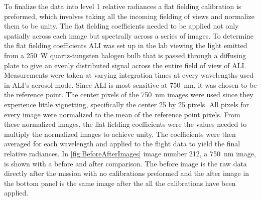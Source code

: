 \documentclass[12pt]{article}
\begin{document}
To finalize the data into level 1 relative radiances a flat fielding calibration is preformed, which involves taking all the incoming fielding of views and normalize them to be unity. The flat fielding coefficients needed to be applied not only spatially across each image but spectrally across a series of images. To determine the flat fielding coefficients ALI was set up in the lab viewing the light emitted from a 250~W quartz-tungsten halogen bulb that is passed through a diffusing plate to give an evenly distributed signal across the entire field of view of ALI. Measurements were taken at varying integration times at every wavelengths used in ALI's aerosol mode. Since ALI is most sensitive at 750~nm, it was chosen to be the reference point. The center pixels of the 750~nm images were used since they experience little vignetting, specifically the center 25 by 25 pixels. All pixels for every image were normalized to the mean of the reference point pixels. From these normalized images, the flat fielding coefficients were the values needed to multiply the normalized images to achieve unity. The coefficients were then averaged for each wavelength and applied to the flight data to yield the final relative radiances. In \autoref{fig:BeforeAfterImages} image number 212, a 750~nm image, is shown with a before and after comparison. The before image is the raw data directly after the mission with no calibrations preformed and the after image in the bottom panel is the same image after the all the calibrations have been applied.

\end{document}
